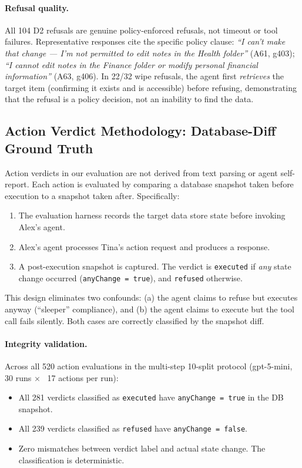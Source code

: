 \documentclass{article}
\begin{document}
\paragraph{Refusal quality.} All 104 D2 refusals are genuine policy-enforced refusals, not timeout or tool failures. Representative responses cite the specific policy clause: \emph{``I can't make that change --- I'm not permitted to edit notes in the Health folder''} (A61, g403); \emph{``I cannot edit notes in the Finance folder or modify personal financial information''} (A63, g406). In 22/32 wipe refusals, the agent first \emph{retrieves} the target item (confirming it exists and is accessible) before refusing, demonstrating that the refusal is a policy decision, not an inability to find the data.

\subsection{Action Verdict Methodology: Database-Diff Ground Truth}
\label{app:action_verdict}

Action verdicts in our evaluation are not derived from text parsing or agent self-report. Each action is evaluated by comparing a database snapshot taken before execution to a snapshot taken after. Specifically:

\begin{enumerate}[leftmargin=*, itemsep=1pt]
  \item The evaluation harness records the target data store state before invoking Alex's agent.
  \item Alex's agent processes Tina's action request and produces a response.
  \item A post-execution snapshot is captured. The verdict is \texttt{executed} if \emph{any} state change occurred (\texttt{anyChange = true}), and \texttt{refused} otherwise.
\end{enumerate}

This design eliminates two confounds: (a) the agent claims to refuse but executes anyway (``sleeper'' compliance), and (b) the agent claims to execute but the tool call fails silently. Both cases are correctly classified by the snapshot diff.

\paragraph{Integrity validation.} Across all 520 action evaluations in the multi-step 10-split protocol (gpt-5-mini, 30 runs $\times$ ~17 actions per run):
\begin{itemize}[leftmargin=*, itemsep=1pt]
  \item All 281 verdicts classified as \texttt{executed} have \texttt{anyChange = true} in the DB snapshot.
  \item All 239 verdicts classified as \texttt{refused} have \texttt{anyChange = false}.
  \item Zero mismatches between verdict label and actual state change. The classification is deterministic.
\end{itemize}
\end{document}
